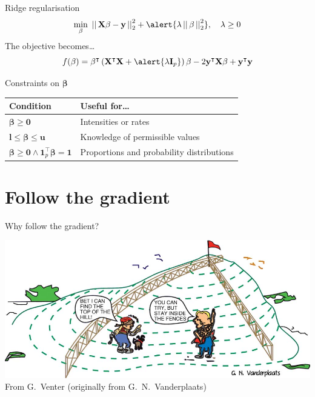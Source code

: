\documentclass[12pt,aspectratio=169]{beamer}
\renewcommand{\vec}[1]{\ensuremath{\mathbf{#1}}}
\newcommand{\mat}[1]{\ensuremath{\vec{#1}}}
\newcommand{\tr}{\ensuremath{\intercal}}
\begin{document}
\begin{frame}{Ridge regularisation}
    \[
        \min_{\vec{\beta}} \ \left|\left|\,\mat{X}\vec{\beta} - \vec{y}\,\right|\right|_{2}^{2}
        + \alert{\lambda \left|\left|\, \vec{\beta} \,\right|\right|_{2}^{2}},
        \quad
        \lambda \geq 0
    \]
    \vfill
    The objective becomes\ldots
    \[
        f(\vec{\beta}) = \vec{\beta}^{\tr} \left( \mat{X}^{\tr} \mat{X} + \alert{\lambda \mat{I}_{p}} \right) \vec{\beta} - 2 \vec{y}^{\tr} \mat{X} \vec{\beta} + \vec{y}^{\tr} \vec{y}
    \]
\end{frame}

\begin{frame}{Constraints on $\vec{\beta}$}
    \centering%
    \begin{tabular}{ll}
        \toprule
        \textbf{Condition} & \textbf{Useful for\ldots} \\
        \midrule
        $\vec{\beta} \geq \vec{0}$ & Intensities or rates \\
        $\vec{l} \leq \vec{\beta} \leq \vec{u}$ & Knowledge of permissible values \\
        $\vec{\beta} \geq \vec{0} \land \vec{1}^{\tr}_{p} \vec{\beta} = \vec{1}$ & Proportions and probability distributions \\
        \bottomrule
    \end{tabular}
\end{frame}

\section{Follow the gradient}

\begin{frame}{Why follow the gradient?}
    \begin{center}
        \includegraphics[height=0.8\textheight]{figures/hill_climbing} \\
        {\scriptsize%
         From G.\ Venter (originally from G.\ N.\ Vanderplaats)}
    \end{center}
\end{frame}
\end{document}

